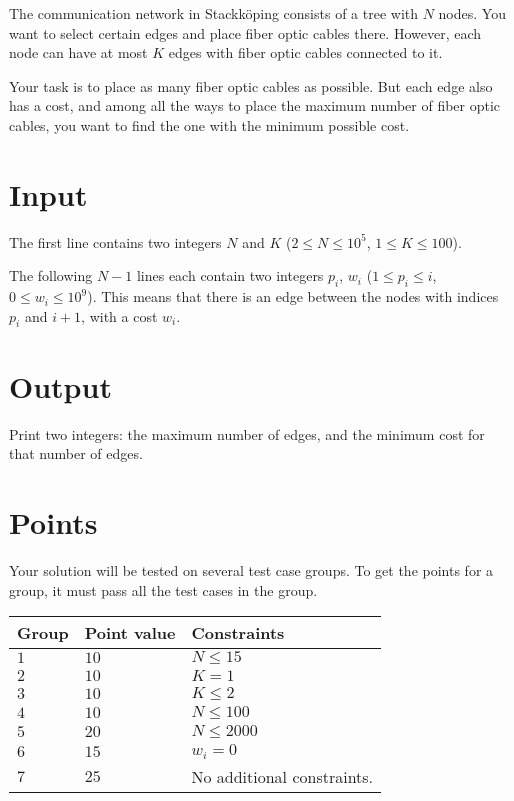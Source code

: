 \noindent
The communication network in Stackköping consists of a tree with $N$ nodes. You want to select certain edges and place fiber optic cables there. However, each node can have at most $K$ edges with fiber optic cables connected to it.

Your task is to place as many fiber optic cables as possible. But each edge also has a cost, and among all the ways to place the maximum number of fiber optic cables, you want to find the one with the minimum possible cost.

\section*{Input}
The first line contains two integers $N$ and $K$ ($2 \leq N \leq 10^5$, $1 \leq K \leq 100$).

The following $N-1$ lines each contain two integers $p_i$, $w_i$ ($1 \leq p_i \leq i$, $0 \leq w_i \leq 10^9$).
This means that there is an edge between the nodes with indices $p_i$ and $i+1$, with a cost $w_i$.

\section*{Output}
Print two integers: the maximum number of edges, and the minimum cost for that number of edges.

\section*{Points}
Your solution will be tested on several test case groups.
To get the points for a group, it must pass all the test cases in the group.

\noindent
\begin{tabular}{| l | l | l |}
  \hline
  \textbf{Group} & \textbf{Point value} & \textbf{Constraints} \\ \hline
  $1$   & $10$       & $N \leq 15$\\ \hline
  $2$   & $10$       & $K = 1$  \\ \hline
  $3$   & $10$       & $K \leq 2$ \\ \hline
  $4$   & $10$       & $N \leq 100$ \\ \hline
  $5$   & $20$       & $N \leq 2000$ \\ \hline
  $6$   & $15$       & $w_i = 0$ \\ \hline
  $7$   & $25$       & No additional constraints. \\ \hline
\end{tabular}
